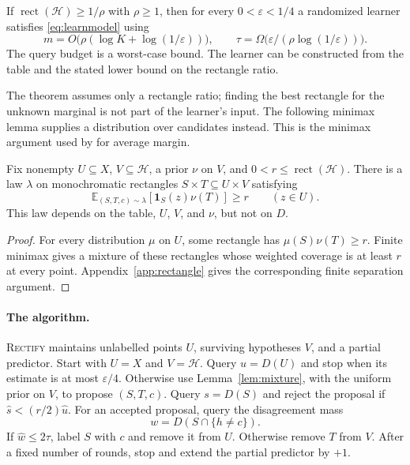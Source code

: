 \documentclass[11pt,letterpaper,pmlr,twoside]{jmlr}
\newcommand{\Hc}{\mathcal H}
\newcommand{\E}{\mathbb E}
\newcommand{\one}{\mathbf 1}
\newcommand{\eps}{\varepsilon}
\newcommand{\rect}{\operatorname{rect}}
\newcommand{\Rectify}{\textsc{Rectify}}
\begin{document}
\begin{theorem}\label{thm:rectangle}
If $\rect(\Hc)\ge1/\rho$ with $\rho\ge1$, then for every $0<\eps<1/4$ a randomized learner satisfies \eqref{eq:learnmodel} using
\begin{equation}
 m=O\bigl(\rho(\log K+\log(1/\eps))\bigr),
 \qquad \tau=\Omega\bigl(\eps/(\rho\log(1/\eps))\bigr).
 \label{eq:rectanglebound}
\end{equation}
The query budget is a worst-case bound. The learner can be constructed from the table and the stated lower bound on the rectangle ratio.
\end{theorem}

The theorem assumes only a rectangle ratio; finding the best rectangle for the unknown marginal is not part of the learner's input. The following minimax lemma supplies a distribution over candidates instead. This is the minimax argument used by \citet{HHPTZ22} for average margin.

\begin{lemma}\label{lem:mixture}
Fix nonempty $U\subseteq X$, $V\subseteq\Hc$, a prior $\nu$ on $V$, and $0<r\le\rect(\Hc)$. There is a law $\lambda$ on monochromatic rectangles $S\times T\subseteq U\times V$ satisfying
\begin{equation}
 \E_{(S,T,c)\sim\lambda}[\one_S(z)\nu(T)]\ge r
 \qquad(z\in U).
 \label{eq:pointwise}
\end{equation}
This law depends on the table, $U$, $V$, and $\nu$, but not on $D$.
\end{lemma}

\begin{proof}
For every distribution $\mu$ on $U$, some rectangle has $\mu(S)\nu(T)\ge r$. Finite minimax gives a mixture of these rectangles whose weighted coverage is at least $r$ at every point. Appendix~\ref{app:rectangle} gives the corresponding finite separation argument.
\end{proof}

\paragraph{The algorithm.}\label{alg:rectify}
\Rectify{} maintains unlabelled points $U$, surviving hypotheses $V$, and a partial predictor. Start with $U=X$ and $V=\Hc$. Query $u=D(U)$ and stop when its estimate is at most $\eps/4$. Otherwise use Lemma~\ref{lem:mixture}, with the uniform prior on $V$, to propose $(S,T,c)$. Query $s=D(S)$ and reject the proposal if $\widehat s<(r/2)\widehat u$. For an accepted proposal, query the disagreement mass
\[
 w=D(S\cap\{h\ne c\}).
\]
If $\widehat w\le2\tau$, label $S$ with $c$ and remove it from $U$. Otherwise remove $T$ from $V$. After a fixed number of rounds, stop and extend the partial predictor by $+1$.
\end{document}
